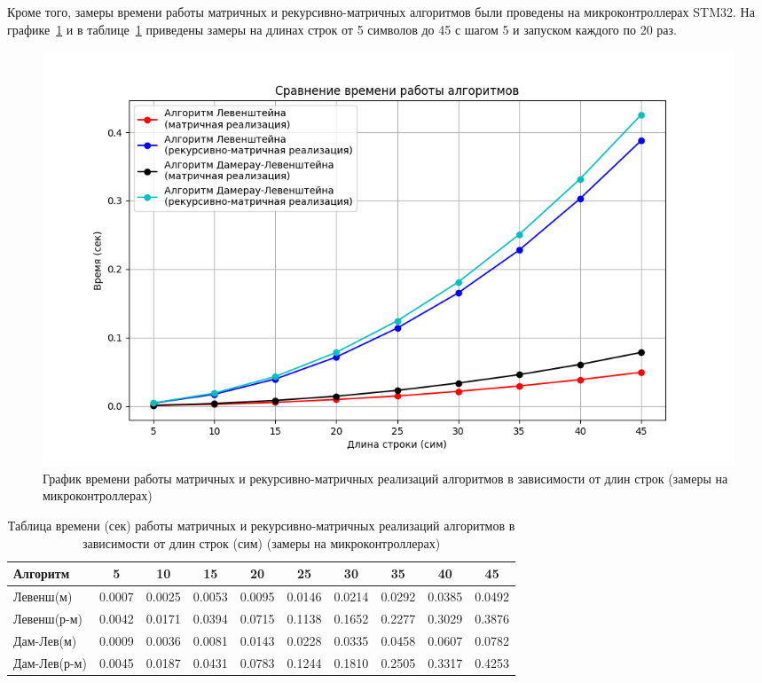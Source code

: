 Кроме того, замеры времени работы матричных и рекурсивно-матричных алгоритмов были проведены на микроконтроллерах STM32. На графике~\ref{fig:graph_mat_rec-mat_micro} и в таблице~\ref{table:table_mat_rec-mat_micro} приведены замеры на длинах строк от 5 символов до 45 с шагом 5 и запуском каждого по 20 раз.

\begin{figure}[H]
    \centering
    \includegraphics[width=1\textwidth]{img/graph_mat_rec-mat_micro.png}
    \caption{График времени работы матричных и рекурсивно-матричных реализаций алгоритмов в зависимости от длин строк (замеры на микроконтроллерах)}
    \label{fig:graph_mat_rec-mat_micro} %
\end{figure}

\begin{table}[H]
    \centering
    \begin{tabular}{|l|c|c|c|c|c|c|c|c|c|}
        \hline
        \textbf{Алгоритм} & \textbf{5} & \textbf{10} & \textbf{15} & \textbf{20} & \textbf{25} & \textbf{30} & \textbf{35} & \textbf{40} & \textbf{45} \\
        \hline
        Левенш(м) & 0.0007 & 0.0025 & 0.0053 & 0.0095 & 0.0146 & 0.0214 & 0.0292 & 0.0385 & 0.0492 \\
        Левенш(р-м) & 0.0042 & 0.0171 & 0.0394 & 0.0715 & 0.1138 & 0.1652 & 0.2277 & 0.3029 & 0.3876 \\
        Дам-Лев(м) & 0.0009 & 0.0036 & 0.0081 & 0.0143 & 0.0228 & 0.0335 & 0.0458 & 0.0607 & 0.0782 \\
        Дам-Лев(р-м) & 0.0045 & 0.0187 & 0.0431 & 0.0783 & 0.1244 & 0.1810 & 0.2505 & 0.3317 & 0.4253 \\
        \hline
    \end{tabular}
    \caption{Таблица времени (сек) работы матричных и рекурсивно-матричных реализаций алгоритмов в зависимости от длин строк (сим) (замеры на микроконтроллерах)}
    \label{table:table_mat_rec-mat_micro}
\end{table}

